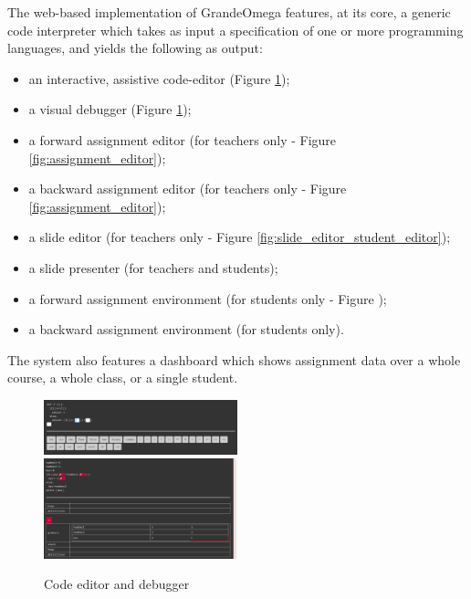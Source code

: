 The web-based implementation of GrandeOmega \cite{grande_omega} features, at its core, a generic code interpreter which takes as input a specification of one or more programming languages, and yields the following as output:

\begin{itemize}[noitemsep]
	\item an interactive, assistive code-editor (Figure \ref{fig:code_editor_debugger});
	\item a visual debugger (Figure \ref{fig:code_editor_debugger});
	\item a forward assignment editor (for teachers only - Figure \ref{fig:assignment_editor});
	\item a backward assignment editor (for teachers only - Figure \ref{fig:assignment_editor});
	\item a slide editor (for teachers only - Figure \ref{fig:slide_editor_student_editor});
	\item a slide presenter (for teachers and students);
	\item a forward assignment environment (for students only - Figure );
	\item a backward assignment environment (for students only).
\end{itemize}

The system also features a dashboard which shows assignment data over a whole course, a whole class, or a single student.

\begin{figure}[!h]
	\includegraphics[width = 0.5\textwidth]{Figures/code_editor}
	\includegraphics[width = 0.5\textwidth]{Figures/debugger}
	\caption{Code editor and debugger}
	\label{fig:code_editor_debugger}
\end{figure}

